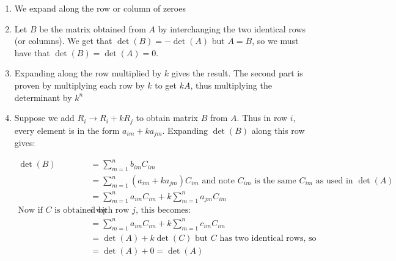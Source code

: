 \documentclass{report}
\begin{document}
\begin{myproof}
\begin{enumerate}
    \item We expand along the row or column of zeroes
    \item Let $B$ be the matrix obtained from  $A$ by interchanging the two identical rows (or columns). We get that  $\det (B) = -\det (A)$ but  $A=B$, so we must have that  $\det (B)=\det (A) = 0$.
    \item Expanding along the row multiplied by  $k$ gives the result. The second part is proven by multiplying each row by  $k$ to get  $kA$, thus multiplying the determinant by  $k^n$ 
    \item Suppose we add $R_i \to R_i + kR_j$ to obtain matrix  $B$ from  $A$. Thus in row  $i$, every element is in the form  $a_{im} + ka_{jm}$. Expanding  $\det (B)$ along this row gives:
         \begin{center}
            \[
            \begin{aligned}
                \det (B) & = \sum_{m=1}^{n} b_{im}C_{im} \\ 
                         & = \sum_{m=1}^{n} (a_{im} + ka_{jm})C_{im} \text{ and note $C_{im}$ is the same  $C_{im}$ as used in  $\det (A)$} \\
                         & = \sum_{m=1}^{n} a_{im}C_{im} + k\sum_{m=1}^{n} a_{jm}C_{im}
                        \\ \text{Now if } C \text{ is obtained by replacing row }   &  i \text{ with row }  j \text{, this becomes: }\\ 
                         & = \sum_{m=1}^{n} a_{im}C_{im} + k\sum_{m=1}^{n} c_{im}C_{im} \\ 
                         &  = \det (A) + k\det (C)  \text{ but } C \text{ has two identical rows, so} \\
                          & = \det (A) + 0 = \det (A)
            \end{aligned}
            \]
        \end{center}
    \end{enumerate}
\end{myproof}

\end{document}
